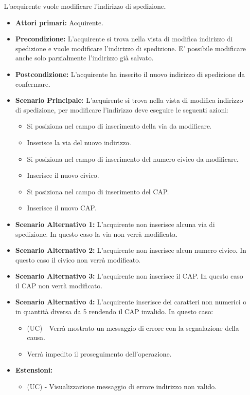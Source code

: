 L'acquirente vuole modificare l'indirizzo di spedizione.
\begin{itemize}
    \item \textbf{Attori primari:} Acquirente.
    \item \textbf{Precondizione:} L'acquirente si trova nella vista di modifica indirizzo di spedizione e vuole modificare l'indirizzo di spedizione. E' possibile modificare anche solo parzialmente l'indirizzo già salvato.
    \item \textbf{Postcondizione:} L'acquirente ha inserito il nuovo indirizzo di spedizione da confermare.
    \item \textbf{Scenario Principale:} L'acquirente si trova nella vista di modifica indirizzo di spedizione, per modificare l'indirizzo deve eseguire le seguenti azioni:
        \begin{itemize}
            \item Si posiziona nel campo di inserimento della via da modificare.
            \item Inserisce la via del nuovo indirizzo.
            \item Si posiziona nel campo di inserimento del numero civico da modificare.
            \item Inserisce il nuovo civico.
            \item Si posiziona nel campo di inserimento del CAP.
            \item Inserisce il nuovo CAP.
        \end{itemize}
    \item \textbf{Scenario Alternativo 1:} L'acquirente non inserisce alcuna via di spedizione. In questo caso la via non verrà modificata.
    \item \textbf{Scenario Alternativo 2:} L'acquirente non inserisce alcun numero civico. In questo caso il civico non verrà modificato.
    \item \textbf{Scenario Alternativo 3:} L'acquirente non inserisce il CAP. In questo caso il CAP non verrà modificato.
    \item \textbf{Scenario Alternativo 4:} L'acquirente inserisce dei caratteri non numerici o in quantità diversa da 5 rendendo il CAP invalido. In questo caso:
    \begin{itemize}
        \item (UC) - Verrà mostrato un messaggio di errore con la segnalazione della causa.
        \item Verrà impedito il proseguimento dell'operazione.
    \end{itemize}
    \item \textbf{Estensioni:}
    \begin{itemize}
        \item (UC) - Visualizzazione messaggio di errore  indirizzo non valido.
    \end{itemize}
\end{itemize}

